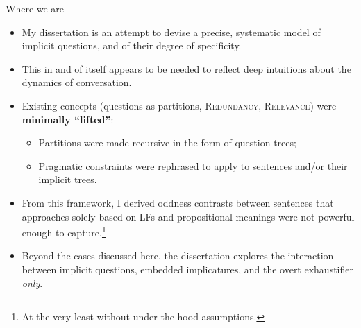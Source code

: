 \documentclass[10pt]{beamer}
\begin{document}
\begin{frame}{Where we are}
	\begin{itemize}
		\item My dissertation is an attempt to devise a precise, systematic model of implicit questions, and of their degree of specificity.
		\item This in and of itself appears to be needed to reflect deep intuitions about the dynamics of conversation.
		\item Existing concepts (questions-as-partitions, \textsc{Redundancy}, \textsc{Relevance}) were \textbf{minimally ``lifted''}:
		\begin{itemize}
			\item Partitions were made recursive in the form of question-trees;
			\item Pragmatic constraints were rephrased to apply to sentences and/or their implicit trees.
		\end{itemize}
		\item From this framework, I derived oddness contrasts between sentences that approaches solely based on LFs and propositional meanings were not powerful enough to capture.\footnote{At the very least without under-the-hood assumptions.}
		\item Beyond the cases discussed here, the dissertation explores the interaction between implicit questions, embedded implicatures, and the overt exhaustifier \textit{only}.
	\end{itemize}\vspace{3mm}
\end{frame}
\end{document}
